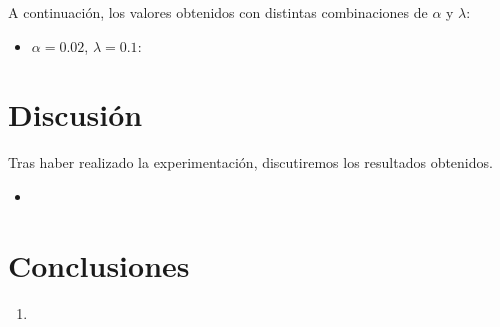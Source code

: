 \documentclass[conference]{IEEEtran}
\begin{document}
A continuación, los valores obtenidos con distintas combinaciones de $\alpha$ y $\lambda$:

\begin{itemize}
\item $\alpha=0.02$, $\lambda=0.1$:

\end{itemize}

\section{Discusión}
Tras haber realizado la experimentación, discutiremos los resultados obtenidos.

\begin{itemize}
\item 
\end{itemize}

\section{Conclusiones}
\begin{enumerate}
\item 
\end{enumerate}
\end{document}
